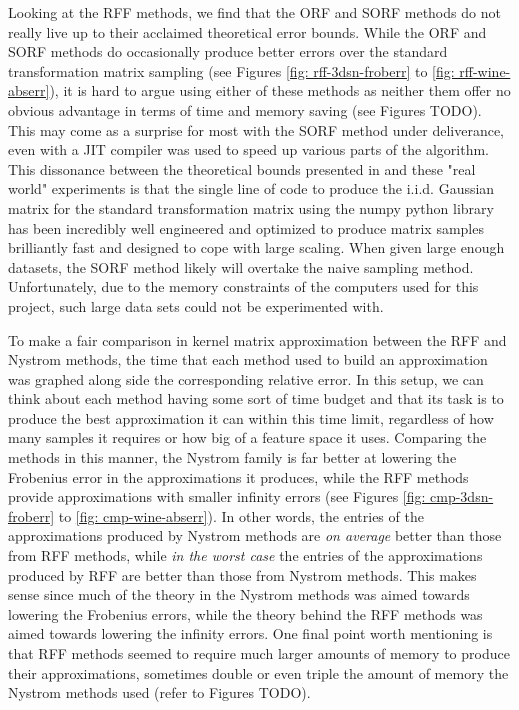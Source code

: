 Looking at the RFF methods, we find that the ORF and SORF methods do not really live up to their acclaimed theoretical error bounds. While the ORF and SORF methods do occasionally produce better errors over the standard transformation matrix sampling (see Figures \ref{fig: rff-3dsn-froberr} to \ref{fig: rff-wine-abserr}), it is hard to argue using either of these methods as neither them offer no obvious advantage in terms of time and memory saving (see Figures TODO). This may come as a surprise for most with the SORF method under deliverance, even with a JIT compiler was used to speed up various parts of the algorithm. This dissonance between the theoretical bounds presented in  and these "real world" experiments is that the single line of code to produce the i.i.d. Gaussian matrix for the standard transformation matrix using the numpy python library has been incredibly well engineered and optimized to produce matrix samples brilliantly fast and designed to cope with large scaling. When given large enough datasets, the SORF method likely will overtake the naive sampling method. Unfortunately, due to the memory constraints of the computers used for this project, such large data sets could not be experimented with.

To make a fair comparison in kernel matrix approximation between the RFF and Nystrom methods, the time that each method used to build an approximation was graphed along side the corresponding relative error. In this setup, we can think about each method having some sort of time budget and that its task is to produce the best approximation it can within this time limit, regardless of how many samples it requires or how big of a feature space it uses. Comparing the methods in this manner, the Nystrom family is far better at lowering the Frobenius error in the approximations it produces, while the RFF methods provide approximations with smaller infinity errors (see Figures \ref{fig: cmp-3dsn-froberr} to \ref{fig: cmp-wine-abserr}). In other words, the entries of the approximations produced by Nystrom methods are {\it on average} better than those from RFF methods, while {\it in the worst case} the entries of the approximations produced by RFF are better than those from Nystrom methods. This makes sense since much of the theory in the Nystrom methods was aimed towards lowering the Frobenius errors, while the theory behind the RFF methods was aimed towards lowering the infinity errors. One final point worth mentioning is that RFF methods seemed to require much larger amounts of memory to produce their approximations, sometimes double or even triple the amount of memory the Nystrom methods used (refer to Figures TODO).